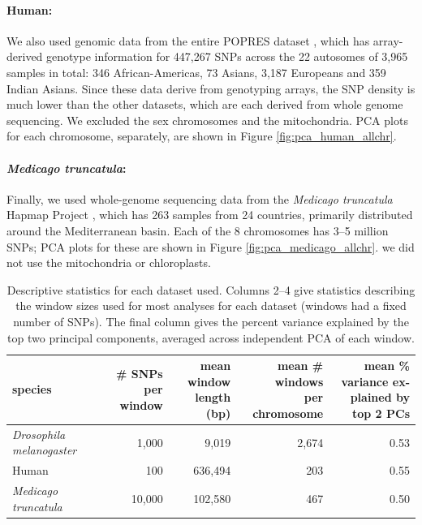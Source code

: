 \documentclass[11pt, oneside]{article}   	%
\begin{document}
\paragraph{Human:}
We also used genomic data from the entire POPRES dataset \citep{nelson2008population},
which has array-derived genotype information for 447,267 SNPs across the 22 autosomes
of 3,965 samples in total: 346 African-Americas, 73 Asians, 3,187 Europeans and 359 Indian Asians.
Since these data derive from genotyping arrays, the SNP density is much lower than the other datasets,
which are each derived from whole genome sequencing.
We excluded the sex chromosomes and the mitochondria.
PCA plots for each chromosome, separately, are shown in Figure \ref{fig:pca_human_allchr}.


\paragraph{\textit{Medicago truncatula}:}
Finally, we used whole-genome sequencing data from the \textit{Medicago truncatula} Hapmap Project \citep{tang2014improved},
which has 263 samples from 24 countries,
primarily distributed around the Mediterranean basin.
Each of the 8 chromosomes has 3--5 million SNPs;
PCA plots for these are shown in Figure \ref{fig:pca_medicago_allchr}.
we did not use the mitochondria or chloroplasts.

\begin{table}[ht]
\centering
    \begin{tabular}{p{0.8in}rrrr}
  \hline
    species 
    & \parbox[t]{.8in}{\# SNPs per \\ window} 
    & \parbox[t]{1in}{mean window\\ length (bp)}
    & \parbox[t]{1.2in}{mean \# windows \\ per chromosome} 
    & \parbox[t]{1.4in}{mean \% variance ex-\\plained by top 2 PCs} \\ 
  \hline
  \textit{Drosophila melanogaster} & 1,000 & 9,019 & 2,674 & 0.53 \\ 
  Human & 100 & 636,494 & 203 & 0.55 \\ 
  \textit{Medicago truncatula} & 10,000 & 102,580 & 467 & 0.50 \\ 
   \hline
\end{tabular}
\caption{
    Descriptive statistics for each dataset used.
    Columns 2--4 give statistics describing the window sizes used for most analyses for each dataset
    (windows had a fixed number of SNPs).
    The final column gives the percent variance explained by the top two principal components,
    averaged across independent PCA of each window.
    \label{tab:data_stats}
}
\end{table}
\end{document}
